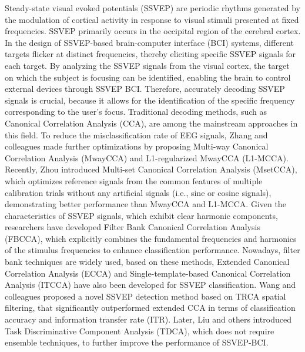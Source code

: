\documentclass[10pt]{iopart}
\begin{document}
Steady-state visual evoked potentials (SSVEP) are periodic rhythms generated by the modulation of cortical activity in response to visual stimuli presented at fixed frequencies\cite{zhu2010survey}. SSVEP primarily occurs in the occipital region of the cerebral cortex. In the design of SSVEP-based brain-computer interface (BCI) systems, different targets flicker at distinct frequencies, thereby eliciting specific SSVEP signals for each target. By analyzing the SSVEP signals from the visual cortex, the target on which the subject is focusing can be identified, enabling the brain to control external devices through SSVEP BCI. Therefore, accurately decoding SSVEP signals is crucial, because it allows for the identification of the specific frequency corresponding to the user's focus. Traditional decoding methods, such as Canonical Correlation Analysis (CCA)\cite{lin2006frequency}, are among the mainstream approaches in this field. To reduce the misclassification rate of EEG signals, Zhang and colleagues made further optimizations by proposing Multi-way Canonical Correlation Analysis (MwayCCA)\cite{zhang2011multiway} and L1-regularized MwayCCA (L1-MCCA)\cite{zhang2013l1}. Recently, Zhou introduced Multi-set Canonical Correlation Analysis (MsetCCA)\cite{zhang2014frequency}, which optimizes reference signals from the common features of multiple calibration trials without any artificial signals (i.e., sine or cosine signals), demonstrating better performance than MwayCCA and L1-MCCA\cite{gao2021improvement}. Given the characteristics of SSVEP signals, which exhibit clear harmonic components, researchers have developed Filter Bank Canonical Correlation Analysis (FBCCA)\cite{chen2015filter}, which explicitly combines the fundamental frequencies and harmonics of the stimulus frequencies to enhance classification performance. Nowadays, filter bank techniques are widely used, based on these methods, Extended Canonical Correlation Analysis (ECCA) and Single-template-based Canonical Correlation Analysis (ITCCA)\cite{bin2011high} have also been developed for SSVEP classification. Wang and colleagues proposed a novel SSVEP detection method based on TRCA spatial filtering\cite{nakanishi2017enhancing}, that significantly outperformed extended CCA in terms of classification accuracy and information transfer rate (ITR). Later, Liu and others introduced Task Discriminative Component Analysis (TDCA)\cite{liu2021improving}, which does not require ensemble techniques, to further improve the performance of SSVEP-BCI.
\end{document}
